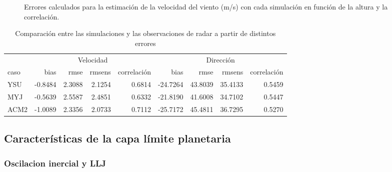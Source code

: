 \documentclass[12pt,spanish,oneside]{book}
\begin{document}
\begin{figure}

{\centering {}\newline{}

}

\caption{Errores calculados para la estimación de la velocidad del viento (m/s) con cada simulación en función de la altura y la correlación. \label{err-spd}}\label{fig:err-spd}
\end{figure}

\begin{table}

\caption{\label{tab:err-tabla}Comparación entre las simulaciones y las observaciones de radar a partir de distintos errores}
\centering
\begin{tabular}[t]{lrrrrrrrr}
\toprule
\multicolumn{1}{c}{ } & \multicolumn{4}{c}{Velocidad} & \multicolumn{4}{c}{Dirección} \\
\cmidrule(l{2pt}r{2pt}){2-5} \cmidrule(l{2pt}r{2pt}){6-9}
caso & bias & rmse & rmsens & correlación & bias & rmse & rmsens & correlación\\
\midrule
YSU & -0.8484 & 2.3088 & 2.1254 & 0.6814 & -24.7264 & 43.8039 & 35.4133 & 0.5459\\
MYJ & -0.5639 & 2.5587 & 2.4851 & 0.6332 & -21.8190 & 41.6008 & 34.7102 & 0.5447\\
ACM2 & -1.0089 & 2.3356 & 2.0733 & 0.7112 & -25.7172 & 45.4811 & 36.7295 & 0.5270\\
\bottomrule
\end{tabular}
\end{table}

\subsection{Características de la capa límite
planetaria}\label{caracteristicas-de-la-capa-limite-planetaria-1}

\subsubsection{Oscilacion inercial y
LLJ}\label{oscilacion-inercial-y-llj-1}
\end{document}
